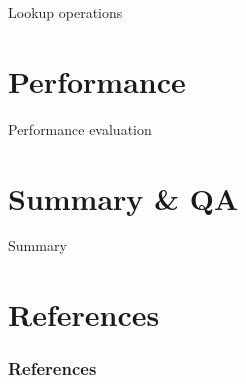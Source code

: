 \documentclass{beamer}
\begin{document}
\begin{frame}{Lookup operations}
\end{frame}

\section{Performance}


\begin{frame}{Performance evaluation}
\end{frame}

\section{Summary \& QA}

\begin{frame}{Summary}
\end{frame}

\section{References}

\begin{frame}[allowframebreaks]
		\frametitle{References}
		\printbibliography
\end{frame}
\end{document}

